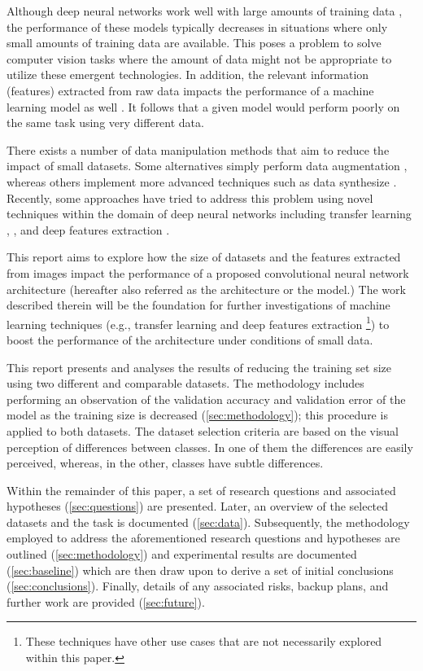 \documentclass{article}
\begin{document}
Although deep neural networks work well with large amounts of training data \cite{lotsDataAndrew}, the performance of these models typically decreases in situations where only small amounts of training data are available. This poses a problem to solve computer vision tasks where the amount of data might not be appropriate to utilize these emergent technologies. In addition, the relevant information (features) extracted from raw data impacts the performance of a machine learning model as well \citep{blum1997selection}. It follows that a given model would perform poorly on the same task using very different data.

There exists a number of data manipulation methods that aim to reduce the impact of small datasets. Some alternatives simply perform data augmentation \cite{krizhevsky2012imagenet}, whereas others implement more advanced techniques such as data synthesize \cite{hu2018frankenstein}. Recently, some approaches have tried to address this problem using novel techniques within the domain of deep neural networks including transfer learning \citep{ng2015deep}, \cite{oquab2014learning}, and deep features extraction \citep{chen2016deep}.

This report aims to explore how the size of datasets and the features extracted from images impact the performance of a proposed convolutional neural network architecture (hereafter also referred as the architecture or the model.) The work described therein will be the foundation for further investigations of machine learning techniques (e.g., transfer learning and deep features extraction \footnote{These techniques have other use cases that are not necessarily explored within this paper.}) to boost the performance of the architecture under conditions of small data.

This report presents and analyses the results of reducing the training set size using two different and comparable datasets. The methodology includes performing an observation of the validation accuracy and validation error of the model as the training size is decreased (\ref{sec:methodology}); this procedure is applied to both datasets. The dataset selection criteria are based on the visual perception of differences between classes. In one of them the differences are easily perceived, whereas, in the other, classes have subtle differences.

Within the remainder of this paper, a set of research questions and associated hypotheses (\ref{sec:questions}) are presented. Later, an overview of the selected datasets and the task is documented (\ref{sec:data}). Subsequently, the methodology employed to address the aforementioned research questions and hypotheses are outlined (\ref{sec:methodology}) and experimental results are documented (\ref{sec:baseline}) which are then draw upon to derive a set of initial conclusions (\ref{sec:conclusions}). Finally, details of any associated risks, backup plans, and further work are provided (\ref{sec:future}).
\end{document}
